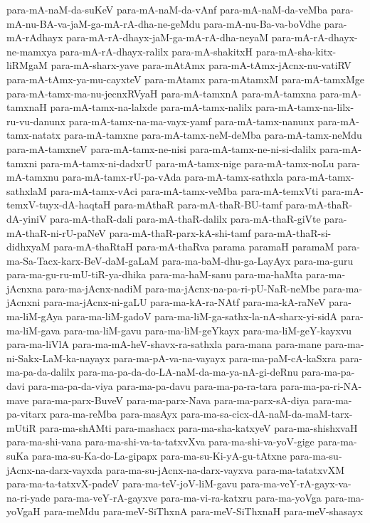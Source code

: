{para-mA-naM-da-suKeV
para-mA-naM-da-vAnf
para-mA-naM-da-veMba
para-mA-nu-BA-va-jaM-ga-mA-rA-dha-ne-geMdu
para-mA-nu-Ba-va-boVdhe
para-mA-rAdhayx
para-mA-rA-dhayx-jaM-ga-mA-rA-dha-neyaM
para-mA-rA-dhayx-ne-mamxya
para-mA-rA-dhayx-ralilx
para-mA-shakitxH
para-mA-sha-kitx-liRMgaM
para-mA-sharx-yave
para-mAtAmx
para-mA-tAmx-jAcnx-nu-vatiRV
para-mA-tAmx-ya-mu-cayxteV
para-mAtamx
para-mAtamxM
para-mA-tamxMge
para-mA-tamx-ma-nu-jecnxRVyaH
para-mA-tamxnA
para-mA-tamxna
para-mA-tamxnaH
para-mA-tamx-na-lalxde
para-mA-tamx-nalilx
para-mA-tamx-na-lilx-ru-vu-danunx
para-mA-tamx-na-ma-vayx-yamf
para-mA-tamx-nanunx
para-mA-tamx-natatx
para-mA-tamxne
para-mA-tamx-neM-deMba
para-mA-tamx-neMdu
para-mA-tamxneV
para-mA-tamx-ne-nisi
para-mA-tamx-ne-ni-si-dalilx
para-mA-tamxni
para-mA-tamx-ni-dadxrU
para-mA-tamx-nige
para-mA-tamx-noLu
para-mA-tamxnu
para-mA-tamx-rU-pa-vAda
para-mA-tamx-sathxla
para-mA-tamx-sathxlaM
para-mA-tamx-vAci
para-mA-tamx-veMba
para-mA-temxVti
para-mA-temxV-tuyx-dA-haqtaH
para-mAthaR
para-mA-thaR-BU-tamf
para-mA-thaR-dA-yiniV
para-mA-thaR-dali
para-mA-thaR-dalilx
para-mA-thaR-giVte
para-mA-thaR-ni-rU-paNeV
para-mA-thaR-parx-kA-shi-tamf
para-mA-thaR-si-didhxyaM
para-mA-thaRtaH
para-mA-thaRva
parama
paramaH
paramaM
para-ma-Sa-Tacx-karx-BeV-daM-gaLaM
para-ma-baM-dhu-ga-LayAyx
para-ma-guru
para-ma-gu-ru-mU-tiR-ya-dhika
para-ma-haM-sanu
para-ma-haMta
para-ma-jAcnxna
para-ma-jAcnx-nadiM
para-ma-jAcnx-na-pa-ri-pU-NaR-neMbe
para-ma-jAcnxni
para-ma-jAcnx-ni-gaLU
para-ma-kA-ra-NAtf
para-ma-kA-raNeV
para-ma-liM-gAya
para-ma-liM-gadoV
para-ma-liM-ga-sathx-la-nA-sharx-yi-sidA
para-ma-liM-gava
para-ma-liM-gavu
para-ma-liM-geYkayx
para-ma-liM-geY-kayxvu
para-ma-liVlA
para-ma-mA-heV-shavx-ra-sathxla
para-mana
para-mane
para-ma-ni-Sakx-LaM-ka-nayayx
para-ma-pA-va-na-vayayx
para-ma-paM-cA-kaSxra
para-ma-pa-da-dalilx
para-ma-pa-da-do-LA-naM-da-ma-ya-nA-gi-deRnu
para-ma-pa-davi
para-ma-pa-da-viya
para-ma-pa-davu
para-ma-pa-ra-tara
para-ma-pa-ri-NA-mave
para-ma-parx-BuveV
para-ma-parx-Nava
para-ma-parx-sA-diya
para-ma-pa-vitarx
para-ma-reMba
para-masAyx
para-ma-sa-cicx-dA-naM-da-maM-tarx-mUtiR
para-ma-shAMti
para-mashacx
para-ma-sha-katxyeV
para-ma-shishxvaH
para-ma-shi-vana
para-ma-shi-va-ta-tatxvXva
para-ma-shi-va-yoV-gige
para-ma-suKa
para-ma-su-Ka-do-La-gipapx
para-ma-su-Ki-yA-gu-tAtxne
para-ma-su-jAcnx-na-darx-vayxda
para-ma-su-jAcnx-na-darx-vayxva
para-ma-tatatxvXM
para-ma-ta-tatxvX-padeV
para-ma-teV-joV-liM-gavu
para-ma-veY-rA-gayx-va-na-ri-yade
para-ma-veY-rA-gayxve
para-ma-vi-ra-katxru
para-ma-yoVga
para-ma-yoVgaH
para-meMdu
para-meV-SiThxnA
para-meV-SiThxnaH
para-meV-shasayx
}
